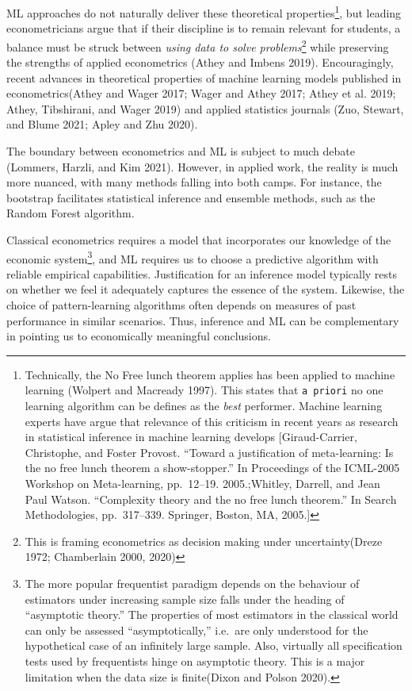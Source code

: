 \documentclass{article}
\begin{document}
ML approaches do not naturally deliver these theoretical
properties\footnote{Technically, the No Free lunch theorem applies has
  been applied to machine learning (Wolpert and Macready 1997). This
  states that \texttt{a\ priori} no one learning algorithm can be
  defines as the \emph{best} performer. Machine learning experts have
  argue that relevance of this criticism in recent years as research in
  statistical inference in machine learning develops {[}Giraud-Carrier,
  Christophe, and Foster Provost. ``Toward a justification of
  meta-learning: Is the no free lunch theorem a show-stopper.'' In
  Proceedings of the ICML-2005 Workshop on Meta-learning, pp.~12--19.
  2005.;Whitley, Darrell, and Jean Paul Watson. ``Complexity theory and
  the no free lunch theorem.'' In Search Methodologies, pp.~317--339.
  Springer, Boston, MA, 2005.{]}}, but leading econometricians argue
that if their discipline is to remain relevant for students, a balance
must be struck between \emph{using data to solve problems}\footnote{This
  is framing econometrics as decision making under uncertainty(Dreze
  1972; Chamberlain 2000, 2020)} while preserving the strengths of
applied econometrics (Athey and Imbens 2019). Encouragingly, recent
advances in theoretical properties of machine learning models published
in econometrics(Athey and Wager 2017; Wager and Athey 2017; Athey et al.
2019; Athey, Tibshirani, and Wager 2019) and applied statistics journals
(Zuo, Stewart, and Blume 2021; Apley and Zhu 2020).

The boundary between econometrics and ML is subject to much debate
(Lommers, Harzli, and Kim 2021). However, in applied work, the reality
is much more nuanced, with many methods falling into both camps. For
instance, the bootstrap facilitates statistical inference and ensemble
methods, such as the Random Forest algorithm.

Classical econometrics requires a model that incorporates our knowledge
of the economic system\footnote{The more popular frequentist paradigm
  depends on the behaviour of estimators under increasing sample size
  falls under the heading of ``asymptotic theory.'' The properties of
  most estimators in the classical world can only be assessed
  ``asymptotically,'' i.e.~are only understood for the hypothetical case
  of an infinitely large sample. Also, virtually all specification tests
  used by frequentists hinge on asymptotic theory. This is a major
  limitation when the data size is finite(Dixon and Polson 2020).}, and
ML requires us to choose a predictive algorithm with reliable empirical
capabilities. Justification for an inference model typically rests on
whether we feel it adequately captures the essence of the system.
Likewise, the choice of pattern-learning algorithms often depends on
measures of past performance in similar scenarios. Thus, inference and
ML can be complementary in pointing us to economically meaningful
conclusions.
\end{document}

